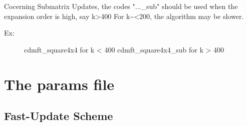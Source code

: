\documentclass[letterpaper,10pt,english]{sphinxmanual}
\begin{document}
Cocerning Submatrix Updates, the codes "...\_sub" should be used when the expansion order is high, say k\textgreater{}400
For k\textasciitilde{}\textless{}200, the algorithm may be slower.
\begin{description}
\item[{Ex:}] \leavevmode
cdmft\_square4x4 for k \textless{} 400
cdmft\_square4x4\_sub for k \textgreater{} 400

\end{description}


\chapter{The params file}
\label{\detokenize{params:the-params-file}}\label{\detokenize{params::doc}}

\section{Fast-Update Scheme}
\label{\detokenize{params:fast-update-scheme}}
\end{document}
